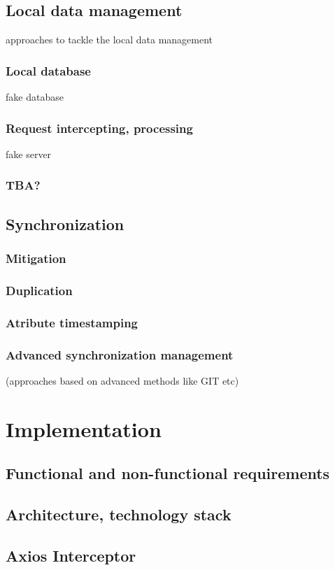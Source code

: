 \documentclass[
  digital,     %
  color,       %
  oneside,     %
  nosansbold,  %
  nocolorbold, %
  lof,         %
  lot,         %
]{fithesis4}
\begin{document}
\section{Local data management}
approaches to tackle the local data management
\subsection{Local database}
fake database
\subsection{Request intercepting, processing}
fake server
\subsection{TBA?}
\section{Synchronization}
\subsection{Mitigation}
\subsection{Duplication}
\subsection{Atribute timestamping}
\subsection{Advanced synchronization management}
(approaches based on advanced methods like GIT etc)

\chapter{Implementation}
\section{Functional and non-functional requirements}
\section{Architecture, technology stack}
\section{Axios Interceptor}
\end{document}
